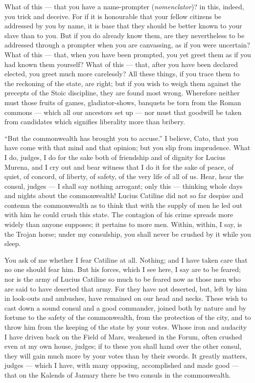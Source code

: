  What of this --- that you have a name-prompter (\textit{nomenclator})? in this, indeed, you trick and deceive. For if it is honourable that your fellow citizens be addressed by you by name, it is base that they should be better known to your slave than to you. But if you do already know them, are they nevertheless to be addressed through a prompter when you are canvassing, as if you were uncertain? What of this --- that, when you have been prompted, you yet greet them as if you had known them yourself? What of this --- that, after you have been declared elected, you greet much more carelessly? All these things, if you trace them to the reckoning of the state, are right; but if you wish to weigh them against the precepts of the Stoic discipline, they are found most wrong. Wherefore neither must those fruits of games, gladiator-shows, banquets be torn from the Roman commons --- which all our ancestors set up --- nor must that goodwill be taken from candidates which signifies liberality more than bribery.

 ``But the commonwealth has brought you to accuse.'' I believe, Cato, that you have come with that mind and that opinion; but you slip from imprudence. What I do, judges, I do for the sake both of friendship and of dignity for Lucius Murena, and I cry out and bear witness that I do it for the sake of peace, of quiet, of concord, of liberty, of safety, of the very life of all of us. Hear, hear the consul, judges --- I shall say nothing arrogant; only this --- thinking whole days and nights about the commonwealth! Lucius Catiline did not so far despise and contemn the commonwealth as to think that with the supply of men he led out with him he could crush this state. The contagion of his crime spreads more widely than anyone supposes; it pertains to more men. Within, within, I say, is the Trojan horse; under my consulship, you shall never be crushed by it while you sleep.

 You ask of me whether I fear Catiline at all. Nothing; and I have taken care that no one should fear him. But his forces, which I see here, I say are to be feared; nor is the army of Lucius Catiline so much to be feared now as those men who are said to have deserted that army. For they have not deserted, but, left by him in look-outs and ambushes, have remained on our head and necks. These wish to cast down a sound consul and a good commander, joined both by nature and by fortune to the safety of the commonwealth, from the protection of the city, and to throw him from the keeping of the state by your votes. Whose iron and audacity I have driven back on the Field of Mars, weakened in the Forum, often crushed even at my own house, judges; if to these you shall hand over the other consul, they will gain much more by your votes than by their swords. It greatly matters, judges --- which I have, with many opposing, accomplished and made good --- that on the Kalends of January there be two consuls in the commonwealth.

